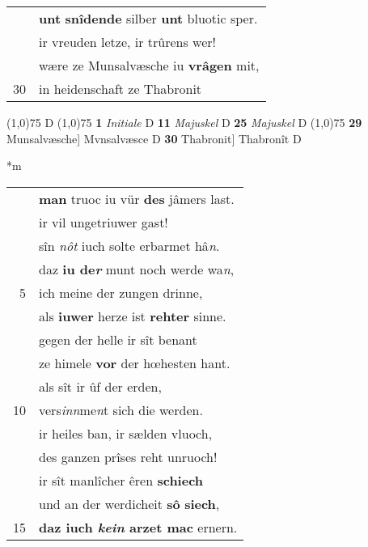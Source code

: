 \documentclass[8pt,a4paper,notitlepage]{article}
\begin{document}
\begin{table}[ht]
\begin{minipage}[t]{0.5\linewidth}
\begin{tabular}{rl}
 & \textbf{unt} \textbf{snîdende} silber \textbf{unt} bluotic sper.\\ 
 & ir vreuden letze, ir trûrens wer!\\ 
 & wære ze Munsalvæsche iu \textbf{vrâgen} mit,\\ 
30 & in heidenschaft ze Thabronit\\ 
\end{tabular}
\scriptsize
\line(1,0){75} \newline
D \newline
\line(1,0){75} \newline
\textbf{1} \textit{Initiale} D  \textbf{11} \textit{Majuskel} D  \textbf{25} \textit{Majuskel} D  \newline
\line(1,0){75} \newline
\textbf{29} Munsalvæsche] Mvnsalvæsce D \textbf{30} Thabronit] Thabronît D \newline
\end{minipage}
\hspace{0.5cm}
\begin{minipage}[t]{0.5\linewidth}
\small
\begin{center}*m
\end{center}
\begin{tabular}{rl}
 & \textbf{man} truoc iu vür \textbf{des} jâmers last.\\ 
 & ir vil ungetriuwer gast!\\ 
 & sîn \textit{nôt} iuch solte erbarmet hâ\textit{n}.\\ 
 & daz \textbf{iu de\textit{r}} munt noch werde wa\textit{n},\\ 
5 & ich meine der zungen drinne,\\ 
 & als \textbf{iuwer} herze ist \textbf{rehter} sinne.\\ 
 & gegen der helle ir sît benant\\ 
 & ze himele \textbf{vor} der hœhesten hant.\\ 
 & als sît ir ûf der erden,\\ 
10 & vers\textit{inn}me\textit{n}t sich die werden.\\ 
 & ir heiles ban, ir sælden vluoch,\\ 
 & des ganzen prîses reht unruoch!\\ 
 & ir sît manlîcher êren \textbf{schiech}\\ 
 & und an der werdicheit \textbf{sô} \textbf{siech},\\ 
15 & \textbf{daz iuch \textit{kein} arzet mac} ernern.\\ 

\end{tabular}
\end{minipage}
\end{table}
\end{document}
